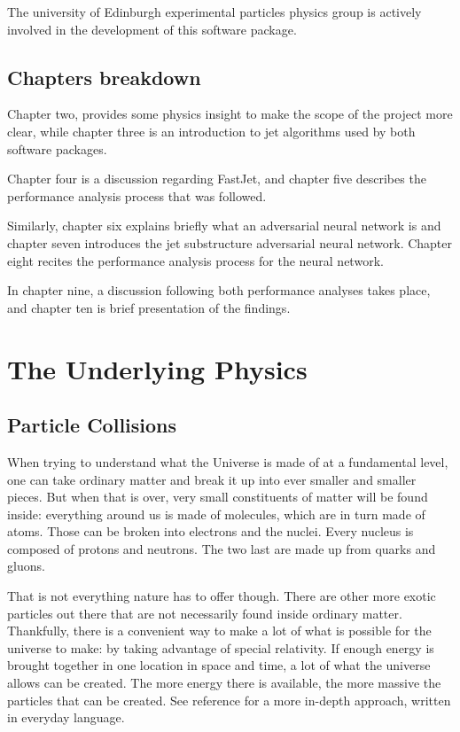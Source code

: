 The university of Edinburgh experimental particles physics group is actively involved in the development of this software package.

\section{Chapters breakdown}

Chapter two, provides some physics insight to make the scope of the project more clear, while chapter three is an introduction to jet algorithms used by both software packages. 

Chapter four is a discussion regarding FastJet, and chapter five describes the performance analysis process that was followed.

Similarly, chapter six explains briefly what an adversarial neural network is and chapter seven introduces the jet substructure adversarial neural network. Chapter eight recites the performance analysis process for the neural network. 

In chapter nine, a discussion following both performance analyses takes place, and chapter ten is brief presentation of the findings.




\chapter{The Underlying Physics }
\section{Particle Collisions}

When trying to understand what the Universe is made of at a fundamental level, one can take ordinary matter and break it up into ever smaller and smaller pieces. But when that is over, very small constituents of matter will be found inside: everything around us is made of molecules, which are in turn made of atoms. Those can be broken into electrons and the nuclei. Every nucleus is composed of protons and neutrons. The two last are made up from quarks and gluons. 

That is not everything nature has to offer though. There are other more exotic particles out there that are not necessarily found inside ordinary matter. Thankfully, there is a convenient way to make a lot of what is possible for the universe to make: by taking advantage of special relativity. If enough energy is brought together in one location in space and time, a lot of what the universe allows can be created. The more energy there is available, the more massive the particles that can be created. See reference \cite{TheLHCmadesimple} for a more in-depth approach, written in everyday language.

